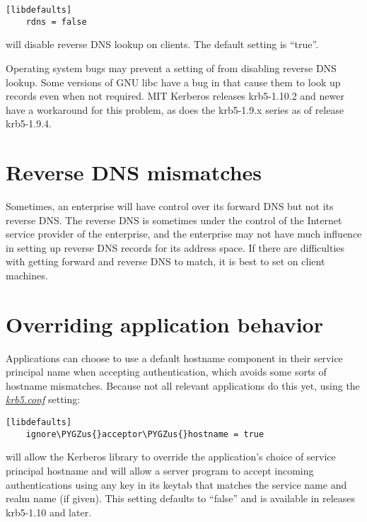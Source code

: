 \documentclass[letterpaper,10pt,english]{sphinxmanual}
\def\PYGZus{\char`\_}
\begin{document}
\begin{Verbatim}[commandchars=\\\{\}]
[libdefaults]
    rdns = false
\end{Verbatim}

will disable reverse DNS lookup on clients.  The default setting is
``true''.

Operating system bugs may prevent a setting of  from
disabling reverse DNS lookup.  Some versions of GNU libc have a bug in
 that cause them to look up  records even when
not required.  MIT Kerberos releases krb5-1.10.2 and newer have a
workaround for this problem, as does the krb5-1.9.x series as of
release krb5-1.9.4.


\section{Reverse DNS mismatches}
\label{admin/princ_dns:reverse-dns-mismatches}
Sometimes, an enterprise will have control over its forward DNS but
not its reverse DNS.  The reverse DNS is sometimes under the control
of the Internet service provider of the enterprise, and the enterprise
may not have much influence in setting up reverse DNS records for its
address space.  If there are difficulties with getting forward and
reverse DNS to match, it is best to set  on client
machines.


\section{Overriding application behavior}
\label{admin/princ_dns:overriding-application-behavior}
Applications can choose to use a default hostname component in their
service principal name when accepting authentication, which avoids
some sorts of hostname mismatches.  Because not all relevant
applications do this yet, using the {\hyperref[admin/conf_files/krb5_conf:krb5-conf-5]{\emph{krb5.conf}}} setting:

\begin{Verbatim}[commandchars=\\\{\}]
[libdefaults]
    ignore\PYGZus{}acceptor\PYGZus{}hostname = true
\end{Verbatim}

will allow the Kerberos library to override the application's choice
of service principal hostname and will allow a server program to
accept incoming authentications using any key in its keytab that
matches the service name and realm name (if given).  This setting
defaults to ``false'' and is available in releases krb5-1.10 and later.
\end{document}
